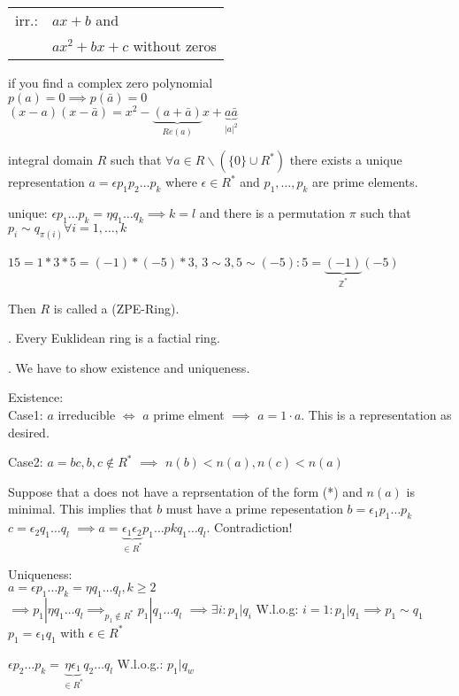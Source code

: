 \begin{tabular}{ll}
  irr.: 
    & $ax+b$ and \\
    & $ax^2 + bx + c$ without zeros\\
\end{tabular}

if you find a complex zero polynomial \\
$p(a) = 0 \implies p(\bar{a}) = 0$ \\
$(x-a)(x-\bar{a}) = x^2 - \underbrace{(a + \bar{a})}_{Re(a)} x + \underbrace{a\bar{a}}_{|a|^2}$

\begin{definition}
integral domain $R$ such that $\forall a \in R \backslash (\{0\} \cup R^{*})$ 
there exists a unique representation $a = \epsilon p_1 p_2 \ldots p_k$ 
where $\epsilon \in R^{*}$ and $p_1, \ldots, p_k$ are prime elements.

unique: $\epsilon p_1 \ldots p_k = \eta q_1 \ldots q_k \implies k=l$ and there is a permutation $\pi$ such that $p_i \sim q_{\pi(i)} \forall i = 1,\ldots, k$

$15 = 1*3*5 = (-1) * (-5) * 3$, $ 3 \sim 3, 5 \sim (-5): 5=\underbrace{(-1)}_{\mathbb{Z}^{*}} (-5)$

Then $R$ is called a  (ZPE-Ring). 
\end{definition}

\Theorem.
Every Euklidean ring is a factial ring.

\Proof.
We have to show existence and uniqueness. 

Existence:\\
Case1: 
$a$ irreducible $\Leftrightarrow$ $a$ prime elment $\implies$ $a=1\cdot a$. This is a representation as desired. 

Case2: $a= bc, b,c \not\in R^{*}$ $\implies$ $n(b) < n(a), n(c) < n(a)$

Suppose that a does not have a reprsentation of the form (*) and $n(a)$ is minimal. 
This implies that $b$ must have a prime repesentation $b = \epsilon_1 p_1 \ldots p_k$ $c = \epsilon_2 q_1 \ldots q_l$ 
$\implies a = \underbrace{\epsilon_1 \epsilon_2}_{\in R^{*}} p_1 \ldots pk q_1 \ldots q_l$. Contradiction!

Uniqueness:\\
$a = \epsilon p_1 \ldots p_k = \eta q_1 \ldots q_l, k\geq 2$\\
$\implies p_1 | \eta q_1 \ldots q_l \implies_{p_1 \not\in R^{*}} p_1 | q_1 \ldots q_l$ 
$\implies \exists i: p_1 |q_i$ W.l.o.g: $i = 1: p_1|q_1 \implies p_1 \sim q_1$ $p_1 = \epsilon_1 q_1$ with $\epsilon \in R^{*}$

$\epsilon p_2 \ldots p_k = \underbrace{\eta \epsilon_1}_{\in R^{*}} q_2 \ldots q_l$ W.l.o.g.: $p_1|q_w$



